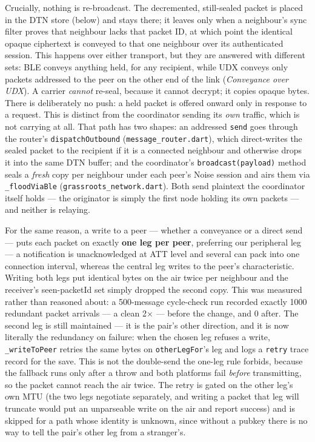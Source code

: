 \documentclass[11pt]{report}
\newcommand{\code}[1]{\texttt{\small #1}}
\begin{document}
Crucially, nothing is re-broadcast. The decremented, still-sealed packet is placed in the DTN store (below) and stays there; it leaves only when a neighbour's sync filter proves that neighbour lacks that packet ID, at which point the identical opaque ciphertext is conveyed to that one neighbour over its authenticated session. This happens over either transport, but they are answered with different sets: BLE conveys anything held, for any recipient, while UDX conveys only packets addressed to the peer on the other end of the link (\emph{Conveyance over UDX}). A carrier \emph{cannot} re-seal, because it cannot decrypt; it copies opaque bytes. There is deliberately no push: a held packet is offered onward only in response to a request. This is distinct from the coordinator sending its \emph{own} traffic, which is not carrying at all. That path has two shapes: an addressed \code{send} goes through the router's \code{dispatchOutbound} (\code{message\_router.dart}), which direct-writes the sealed packet to the recipient if it is a connected neighbour and otherwise drops it into the same DTN buffer; and the coordinator's \code{broadcast(payload)} method seals a \emph{fresh} copy per neighbour under each peer's Noise session and airs them via \code{\_floodViaBle} (\code{grassroots\_network.dart}). Both send plaintext the coordinator itself holds --- the originator is simply the first node holding its own packets --- and neither is relaying.

For the same reason, a write to a peer --- whether a conveyance or a direct send --- puts each packet on exactly \textbf{one leg per peer}, preferring our peripheral leg --- a notification is unacknowledged at ATT level and several can pack into one connection interval, whereas the central leg writes to the peer's characteristic. Writing both legs put identical bytes on the air twice per neighbour and the receiver's seen-packetId set simply dropped the second copy. This was measured rather than reasoned about: a 500-message cycle-check run recorded exactly 1000 redundant packet arrivals --- a clean 2$\times$ --- before the change, and 0 after. The second leg is still maintained --- it is the pair's other direction, and it is now literally the redundancy on failure: when the chosen leg refuses a write, \code{\_writeToPeer} retries the same bytes on \code{otherLegFor}'s leg and logs a \code{retry} trace record for the save. This is not the double-send the one-leg rule forbids, because the fallback runs only after a throw and both platforms fail \emph{before} transmitting, so the packet cannot reach the air twice. The retry is gated on the other leg's own MTU (the two legs negotiate separately, and writing a packet that leg will truncate would put an unparseable write on the air and report success) and is skipped for a path whose identity is unknown, since without a pubkey there is no way to tell the pair's other leg from a stranger's.
\end{document}
